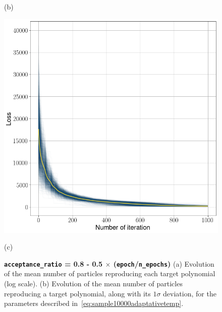 \documentclass[11pt]{article}
\begin{document}
\begin{figure}[h!]
\begin{adjustbox}{width=20cm,center}
\begin{minipage}[t]{0.31\paperwidth}
			\caption*{(b)}
		\end{minipage}%
		\hfill
		\begin{minipage}[t]{0.31\paperwidth}
			\centering
			\includegraphics[width=\linewidth]{Figures/Loss_all_ASMC.png}
			\caption*{(c)}
		\end{minipage}
	\end{adjustbox}
	\caption{{\bfseries \boldmath \texttt{acceptance\_ratio} = 0.8 - 0.5 $\times$ (\texttt{epoch}/\texttt{n\_epochs})} (a) Evolution of the mean number of particles reproducing each target polynomial (log scale). (b) Evolution of the mean number of particles reproducing a target polynomial, along with its $1\sigma$ deviation, for the parameters described in~\eqref{eq:sample10000adaptativetemp}.}
	\label{fig:evolutionoftargetreproduction}
\end{figure}
\end{document}
